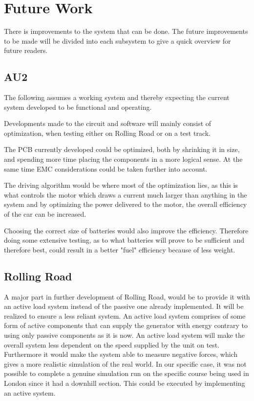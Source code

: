 \chapter {Future Work}
There is improvements to the system that can be done. The future improvements to be made will be divided into each subsystem to give a quick overview for future readers. 

\section{AU2}
The following assumes a working system and thereby expecting the current system developed to be functional and operating.

Developments made to the circuit and software will mainly consist of optimization, when testing either on Rolling Road or on a test track. 

The PCB currently developed could be optimized, both by shrinking it in size, and spending more time placing the components in a more logical sense. At the same time EMC considerations could be taken further into account. 

The driving algorithm would be where most of the optimization lies, as this is what controls the motor which draws a current much larger than anything in the system and by optimizing the power delivered to the motor, the overall efficiency of the car can be increased. 

Choosing the correct size of batteries would also improve the efficiency. Therefore doing some extensive testing, as to what batteries will prove to be sufficient and therefore best, could result in a better "fuel" efficiency because of less weight.  

\section{Rolling Road}
A major part in further development of Rolling Road, would be to provide it with an active load system instead of the passive one already implemented. It will be realized to ensure a less reliant system. An active load system comprises of some form of active components that can supply the generator with energy contrary to using only passive components as it is now. An active load system will make the overall system less dependent on the speed supplied by the unit on test. Furthermore it would make the system able to measure negative forces, which gives a more realistic simulation of the real world. In our specific case, it was not possible to complete a genuine simulation run on the specific course being used in London since it had a downhill section. This could be executed by implementing an active system. 

